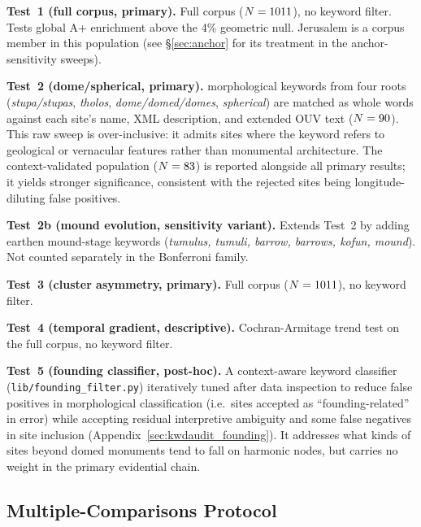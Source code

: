 \documentclass[HARVARD,twocolumn]{USG}
\begin{document}
\textbf{Test~1 (full corpus, primary).}
Full corpus ($N = 1011$), no keyword filter.
Tests global A+ enrichment above the 4\% geometric null.
Jerusalem is a corpus member in this population (see \S\ref{sec:anchor}
for its treatment in the anchor-sensitivity sweeps).

\textbf{Test~2 (dome/spherical, primary).}
\NcircKeywords{} morphological keywords from four roots
(\textit{stupa/stupas}, \textit{tholos}, \textit{dome/domed/domes},
\textit{spherical}) are matched as whole words against each site's
name, XML description, and extended OUV text ($N = 90$).
This raw sweep is over-inclusive: it admits sites where the keyword
refers to geological or vernacular features rather than monumental
architecture. The context-validated population ($N = 83$)
is reported alongside all primary results; it yields stronger
significance, consistent with the rejected sites being
longitude-diluting false positives.

\textbf{Test~2b (mound evolution, sensitivity variant).}
Extends Test~2 by adding earthen mound-stage keywords
(\textit{tumulus, tumuli, barrow, barrows, kofun, mound}).
Not counted separately in the Bonferroni family.

\textbf{Test~3 (cluster asymmetry, primary).}
Full corpus ($N = 1011$), no keyword filter.

\textbf{Test~4 (temporal gradient, descriptive).}
Cochran-Armitage trend test on the full corpus, no keyword filter.

\textbf{Test~5 (founding classifier, post-hoc).}
A context-aware keyword classifier
(\texttt{lib/founding\_filter.py}) iteratively tuned after data
inspection to reduce false positives in morphological classification
(i.e.\ sites accepted as ``founding-related'' in error) while accepting
residual interpretive ambiguity and some false negatives in site inclusion
(Appendix~\ref{sec:kwdaudit_founding}).
It addresses what kinds of sites beyond domed
monuments tend to fall on harmonic nodes, but carries no weight
in the primary evidential chain.

\subsection{Multiple-Comparisons Protocol}
\label{sec:bonferroni}
\end{document}
